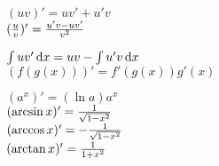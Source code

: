 \documentclass[a4paper, landscape,10pt]{article}
\begin{document}
\begin{multicols}{2}
\begin{multicols}{4}
	$(uv)' = uv' + u'v$ \\
	$ ({u \over v})' = {u'v - uv' \over v^2 } $ \\
	\begin{scriptsize}
	$ \int uv'\,\mathrm{d} x = uv - \int u' v \,\mathrm{d} x$ \\
	$ (f(g(x)))' = f'(g(x)) g'(x) $ \\
\end{scriptsize}
	$ (a^x)' = (\ln a) a^x $ \\
	$ (\arcsin x)' = {1 \over \sqrt{1-x^2}} $ \\
	$ (\arccos x)' = -{1 \over \sqrt{1-x^2}} $ \\
	$ (\arctan x)' = {1 \over 1+x^2} $ \\
\end{multicols}


\end{multicols}
\end{document}
